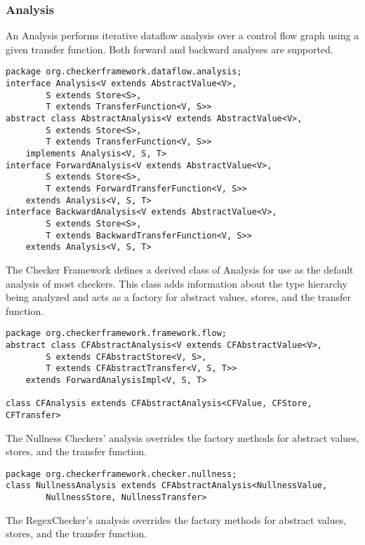 \subsubsection{Analysis}
\label{sec:analysis_classes}

An Analysis performs iterative dataflow analysis over a control flow
graph using a given transfer function.  Both forward and backward
analyses are supported.

\begin{verbatim}
package org.checkerframework.dataflow.analysis;
interface Analysis<V extends AbstractValue<V>,
        S extends Store<S>,
        T extends TransferFunction<V, S>>
abstract class AbstractAnalysis<V extends AbstractValue<V>,
        S extends Store<S>,
        T extends TransferFunction<V, S>>
    implements Analysis<V, S, T>
interface ForwardAnalysis<V extends AbstractValue<V>,
        S extends Store<S>,
        T extends ForwardTransferFunction<V, S>>
    extends Analysis<V, S, T>
interface BackwardAnalysis<V extends AbstractValue<V>,
        S extends Store<S>,
        T extends BackwardTransferFunction<V, S>>
    extends Analysis<V, S, T>
\end{verbatim}

The Checker Framework defines a derived class of Analysis for use as
the default analysis of most checkers.  This class adds information
about the type hierarchy being analyzed and acts as a factory for
abstract values, stores, and the transfer function.

\begin{verbatim}
package org.checkerframework.framework.flow;
abstract class CFAbstractAnalysis<V extends CFAbstractValue<V>,
        S extends CFAbstractStore<V, S>,
        T extends CFAbstractTransfer<V, S, T>>
    extends ForwardAnalysisImpl<V, S, T>

class CFAnalysis extends CFAbstractAnalysis<CFValue, CFStore, CFTransfer>
\end{verbatim}

The Nullness Checkers' analysis overrides the factory methods for
abstract values, stores, and the transfer function.

\begin{verbatim}
package org.checkerframework.checker.nullness;
class NullnessAnalysis extends CFAbstractAnalysis<NullnessValue,
        NullnessStore, NullnessTransfer>
\end{verbatim}

The RegexChecker's analysis overrides the factory methods for abstract
values, stores, and the transfer function.

